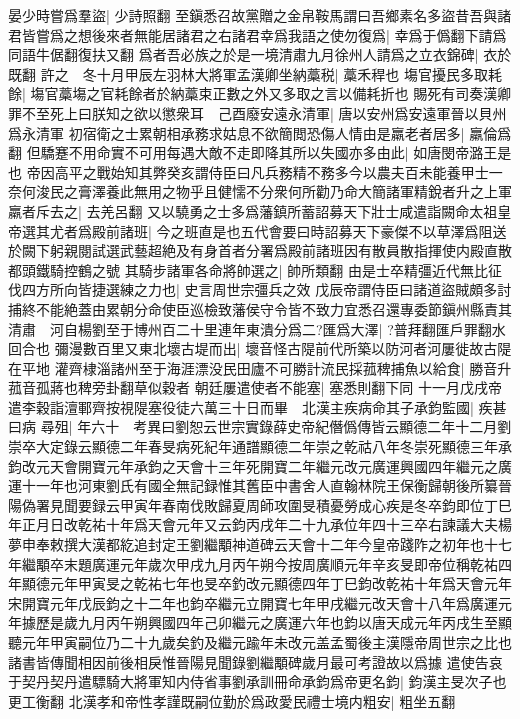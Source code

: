 晏少時嘗爲羣盜|{
	少詩照翻}
至鎭悉召故黨贈之金帛鞍馬謂曰吾鄉素名多盜昔吾與諸君皆嘗爲之想後來者無能居諸君之右諸君幸爲我語之使勿復爲|{
	幸爲于僞翻下請爲同語牛倨翻復扶又翻}
爲者吾必族之於是一境清肅九月徐州人請爲之立衣錦碑|{
	衣於既翻}
許之　冬十月甲辰左羽林大將軍孟漢卿坐納藁税|{
	藁禾稈也}
塲官擾民多取耗餘|{
	塲官藁塲之官耗餘者於納藁束正數之外又多取之言以備耗折也}
賜死有司奏漢卿罪不至死上曰朕知之欲以懲衆耳　己酉廢安遠永清軍|{
	唐以安州爲安遠軍晉以貝州爲永清軍}
初宿衛之士累朝相承務求姑息不欲簡閲恐傷人情由是羸老者居多|{
	羸倫爲翻}
但驕蹇不用命實不可用每遇大敵不走即降其所以失國亦多由此|{
	如唐閔帝潞王是也}
帝因高平之戰始知其弊癸亥謂侍臣曰凡兵務精不務多今以農夫百未能養甲士一奈何浚民之膏澤養此無用之物乎且健懦不分衆何所勸乃命大簡諸軍精銳者升之上軍羸者斥去之|{
	去羌呂翻}
又以驍勇之士多爲藩鎮所蓄詔募天下壯士咸遣詣闕命太祖皇帝選其尤者爲殿前諸班|{
	今之班直是也五代會要曰時詔募天下豪傑不以草澤爲阻送於闕下躬親閱試選武藝超絶及有身首者分署爲殿前諸班因有散員散指揮使内殿直散都頭鐵騎控鶴之號}
其騎步諸軍各命將帥選之|{
	帥所類翻}
由是士卒精彊近代無比征伐四方所向皆捷選練之力也|{
	史言周世宗彊兵之效}
戊辰帝謂侍臣曰諸道盜賊頗多討捕終不能絶蓋由累朝分命使臣巡檢致藩侯守令皆不致力宜悉召還專委節鎭州縣責其清肅　河自楊劉至于博州百二十里連年東潰分爲二?匯爲大澤|{
	?普拜翻匯戶罪翻水回合也}
彌漫數百里又東北壞古堤而出|{
	壞音怪古隄前代所築以防河者河屢徙故古隄在平地}
灌齊棣淄諸州至于海涯漂没民田廬不可勝計流民採菰稗捕魚以給食|{
	勝音升菰音孤蔣也稗旁卦翻草似穀者}
朝廷屢遣使者不能塞|{
	塞悉則翻下同}
十一月戊戌帝遣李穀詣澶鄆齊按視隄塞役徒六萬三十日而畢　北漢主疾病命其子承鈞監國|{
	疾甚曰病}
尋殂|{
	年六十　考異曰劉恕云世宗實錄薛史帝紀僭僞傳皆云顯德二年十二月劉崇卒大定錄云顯德二年春旻病死紀年通譜顯德二年崇之乾祜八年冬崇死顯德三年承鈞改元天會開寶元年承鈞之天會十三年死開寶二年繼元改元廣運興國四年繼元之廣運十一年也河東劉氏有國全無記録惟其舊臣中書舍人直翰林院王保衡歸朝後所纂晉陽偽署見聞要録云甲寅年春南伐敗歸夏周師攻圍旻積憂勞成心疾是冬卒鈞即位丁巳年正月日改乾祐十年爲天會元年又云鈞丙戌年二十九承位年四十三卒右諫議大夫楊夢申奉敕撰大漢都紇追封定王劉繼顒神道碑云天會十二年今皇帝踐阼之初年也十七年繼顒卒末題廣運元年歲次甲戌九月丙午朔今按周廣順元年辛亥旻即帝位稱乾祐四年顯德元年甲寅旻之乾祐七年也旻卒釣改元顯德四年丁巳鈞改乾祐十年爲天會元年宋開寶元年戊辰鈞之十二年也鈞卒繼元立開寶七年甲戌繼元改天會十八年爲廣運元年據歷是歲九月丙午朔興國四年己卯繼元之廣運六年也鈞以唐天成元年丙戌生至顯聽元年甲寅嗣位乃二十九歲矣釣及繼元踰年未改元盖孟蜀後主漢隱帝周世宗之比也諸書皆傳聞相因前後相戾惟晉陽見聞錄劉繼顒碑歲月最可考證故以爲據}
遣使告哀于契丹契丹遣驃騎大將軍知内侍省事劉承訓冊命承鈞爲帝更名鈞|{
	鈞漢主旻次子也更工衡翻}
北漢孝和帝性孝謹既嗣位勤於爲政愛民禮士境内粗安|{
	粗坐五翻}
